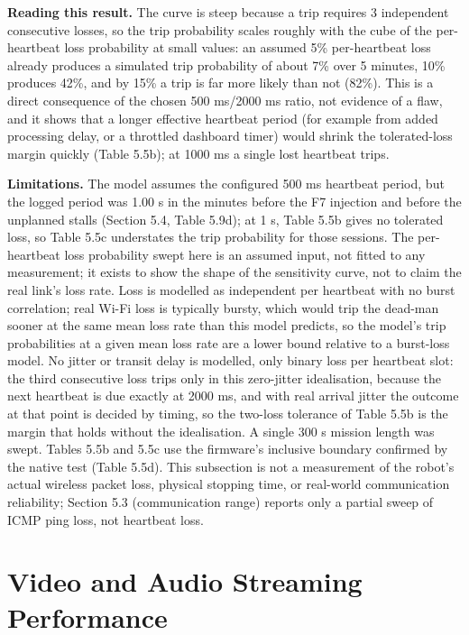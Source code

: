 \textbf{Reading this result.} The curve is steep because a trip requires 3 independent consecutive losses, so the trip probability scales roughly with the cube of the per-heartbeat loss probability at small values: an assumed 5\% per-heartbeat loss already produces a simulated trip probability of about 7\% over 5 minutes, 10\% produces 42\%, and by 15\% a trip is far more likely than not (82\%). This is a direct consequence of the chosen 500 ms/2000 ms ratio, not evidence of a flaw, and it shows that a longer effective heartbeat period (for example from added processing delay, or a throttled dashboard timer) would shrink the tolerated-loss margin quickly (Table 5.5b); at 1000 ms a single lost heartbeat trips.

\textbf{Limitations.} The model assumes the configured 500 ms heartbeat period, but the logged period was 1.00 s in the minutes before the F7 injection and before the unplanned stalls (Section 5.4, Table 5.9d); at 1 s, Table 5.5b gives no tolerated loss, so Table 5.5c understates the trip probability for those sessions. The per-heartbeat loss probability swept here is an assumed input, not fitted to any measurement; it exists to show the shape of the sensitivity curve, not to claim the real link's loss rate. Loss is modelled as independent per heartbeat with no burst correlation; real Wi-Fi loss is typically bursty, which would trip the dead-man sooner at the same mean loss rate than this model predicts, so the model's trip probabilities at a given mean loss rate are a lower bound relative to a burst-loss model. No jitter or transit delay is modelled, only binary loss per heartbeat slot: the third consecutive loss trips only in this zero-jitter idealisation, because the next heartbeat is due exactly at 2000 ms, and with real arrival jitter the outcome at that point is decided by timing, so the two-loss tolerance of Table 5.5b is the margin that holds without the idealisation. A single 300 s mission length was swept. Tables 5.5b and 5.5c use the firmware's inclusive boundary confirmed by the native test (Table 5.5d). This subsection is not a measurement of the robot's actual wireless packet loss, physical stopping time, or real-world communication reliability; Section 5.3 (communication range) reports only a partial sweep of ICMP ping loss, not heartbeat loss.

\section{Video and Audio Streaming Performance}

